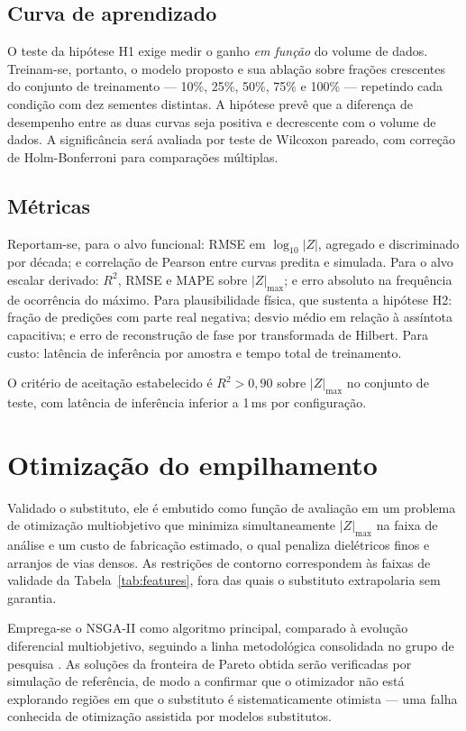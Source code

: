 \subsection{Curva de aprendizado}

O teste da hipótese H1 exige medir o ganho \emph{em função} do volume de dados.
Treinam-se, portanto, o modelo proposto e sua ablação sobre frações crescentes do
conjunto de treinamento — 10\%, 25\%, 50\%, 75\% e 100\% — repetindo cada
condição com dez sementes distintas. A hipótese prevê que a diferença de
desempenho entre as duas curvas seja positiva e decrescente com o volume de
dados. A significância será avaliada por teste de Wilcoxon pareado, com correção
de Holm-Bonferroni para comparações múltiplas.

\subsection{Métricas}

Reportam-se, para o alvo funcional: RMSE em $\log_{10}|Z|$, agregado e
discriminado por década; e correlação de Pearson entre curvas predita e simulada.
Para o alvo escalar derivado: $R^2$, RMSE e MAPE sobre $|Z|_{\max}$; e erro
absoluto na frequência de ocorrência do máximo. Para plausibilidade física, que
sustenta a hipótese H2: fração de predições com parte real negativa; desvio médio
em relação à assíntota capacitiva; e erro de reconstrução de fase por
transformada de Hilbert. Para custo: latência de inferência por amostra e tempo
total de treinamento.

O critério de aceitação estabelecido é $R^2 > 0{,}90$ sobre $|Z|_{\max}$ no
conjunto de teste, com latência de inferência inferior a 1\,ms por configuração.

\section{Otimização do empilhamento}
\label{sec:otimizacao}

Validado o substituto, ele é embutido como função de avaliação em um problema de
otimização multiobjetivo que minimiza simultaneamente $|Z|_{\max}$ na faixa de
análise e um custo de fabricação estimado, o qual penaliza dielétricos finos e
arranjos de vias densos. As restrições de contorno correspondem às faixas de
validade da Tabela~\ref{tab:features}, fora das quais o substituto extrapolaria
sem garantia.

Emprega-se o NSGA-II \citep{deb2002} como algoritmo principal, comparado à
evolução diferencial multiobjetivo, seguindo a linha metodológica consolidada no
grupo de pesquisa \citep{coelho2010}. As soluções da fronteira de Pareto obtida
serão verificadas por simulação de referência, de modo a confirmar que o
otimizador não está explorando regiões em que o substituto é sistematicamente
otimista — uma falha conhecida de otimização assistida por modelos substitutos.

